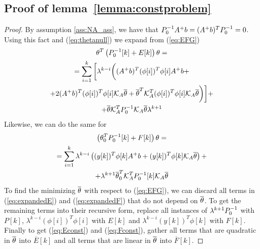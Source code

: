 
\subsection{Proof of lemma~\ref{lemma:constproblem}}
\label{app:constproof}
\begin{proof}
    By assumption \ref{ass:NA_ass}, we have that $P_0^{-1} A^+b = (A^+b)^TP_0^{-1} = 0$.
    Using this fact and (\ref{eq:thetanull}) we expand from (\ref{eq:EFG})
    \begin{equation}
        \begin{gathered}
            \theta^T\left(P_0^{-1}[k] + E[k]\right)\theta = \\
            = \sum\limits_{i=1}^k \bigg{[} \lambda^{k-i}\bigg{(}(A^+b)^T(\phi[i])^T\phi[i]A^+b
            + \\
            + 2(A^+b)^T(\phi[i])^T\phi[i]\mathcal{K}_A\overline{\theta} + \overline{\theta}^T\mathcal{K}_A^T(\phi[i])^T\phi[i]\mathcal{K}_A\overline{\theta} \bigg{)} \bigg{]} + \\
            + \overline{\theta}\mathcal{K}_A^TP_0^{-1}\mathcal{K}_A\overline{\theta}\lambda^{k+1}
        \end{gathered}
        \label{eq:expandedE}
    \end{equation}
    Likewise, we can do the same for 
    \begin{equation}
        \begin{gathered}
            \left(\theta_0^TP_0^{-1}[k] + F[k]\right)\theta = \\
            = \sum\limits_{i=1}^k \lambda^{k-i}\left((y[k])^T\phi[k]A^+b + (y[k])^T\phi[k]\mathcal{K}_A\overline{\theta}\right) + \\
            + \lambda^{k+1}\overline{\theta}_0^T\mathcal{K}_A^TP_0^{-1}[k]\mathcal{K}_A\overline{\theta}
        \end{gathered}
        \label{eq:expandedF}
    \end{equation}
    To find the minimizing $\overline{\theta}$ with respect to (\ref{eq:EFG}), we can discard
    all terms in (\ref{eq:expandedE}) and (\ref{eq:expandedF}) that do not depend on $\overline{\theta}$.
    To get the remaining terms into their recursive form, replace all instances of
    $\lambda^{k+1}P_0^{-1}$ with $P[k]$, $\lambda^{k-i}(\phi[i])^T\phi[i]$ with $E[k]$ and
    $\lambda^{k-i}(y[k])^T\phi[k]$ with $F[k]$. Finally to get (\ref{eq:Econst}) and (\ref{eq:Fconst}),
    gather all terms that are quadratic in $\overline{\theta}$ into $\overline{E}[k]$ and all terms that are linear in
    $\overline{\theta}$ into $\overline{F}[k]$.
\end{proof}